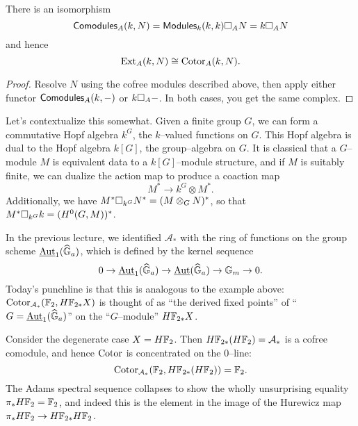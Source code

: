 \begin{corollary}
There is an isomorphism \[\mathsf{Comodules}_A(k, N) = \mathsf{Modules}_k(k, k) \square_A N = k \square_A N\] and hence \[\operatorname{Ext}_A(k, N) \cong \operatorname{Cotor}_A(k, N).\]
\end{corollary}
\begin{proof}
Resolve $N$ using the cofree modules described above, then apply either functor $\mathsf{Comodules}_A(k, -)$ or $k \square_A -$.  In both cases, you get the same complex.
\end{proof}

\begin{example}\label{HopfAlgebrasFromFiniteGroups}
Let's contextualize this somewhat.  Given a finite group $G$, we can form a commutative Hopf algebra $k^G$, the $k$--valued functions on $G$.  This Hopf algebra is dual to the Hopf algebra $k[G]$, the group--algebra on $G$.  It is classical that a $G$--module $M$ is equivalent data to a $k[G]$--module structure, and if $M$ is suitably finite, we can dualize the action map to produce a coaction map \[M^* \to k^G \otimes M^*.\]  Additionally, we have $M^* \square_{k^G} N^* = (M \otimes_G N)^*$, so that $M^* \square_{k^G} k = (H^0 (G,M))^*$.
\end{example}

\begin{example}\label{HF2HomologyIsValuedInAutGaEquivarModules}
In the previous lecture, we identified $\mathcal A_*$ with the ring of functions on the group scheme $\operatorname{\underline{\smash{\operatorname{Aut}}}}_1(\widehat{\mathbb G}_a)$, which is defined by the kernel sequence \[0 \to \operatorname{\underline{\smash{\operatorname{Aut}}}}_1(\widehat{\mathbb G}_a) \to \operatorname{\underline{\smash{\operatorname{Aut}}}}(\widehat{\mathbb G}_a) \to \mathbb G_m \to 0.\]    Today's punchline is that this is analogous to the example above: $\operatorname{Cotor}_{\mathcal A_*}(\mathbb F_2, H\mathbb F_{2*} X)$ is thought of as ``the derived fixed points'' of ``$G = \operatorname{\underline{\smash{\operatorname{Aut}}}}_1(\widehat{\mathbb G}_a)$'' on the ``$G$--module'' $H\mathbb F_{2*} X$.  
\end{example}

\begin{example}
Consider the degenerate case $X = H\mathbb F_2$.  Then $H\mathbb F_{2*}(H\mathbb F_2) = \mathcal A_*$ is a cofree comodule, and hence $\operatorname{Cotor}$ is concentrated on the $0$--line: \[\operatorname{Cotor}_{\mathcal A_*}(\mathbb F_2, H\mathbb F_{2*}(H\mathbb F_2)) = \mathbb F_2.\]  The Adams spectral sequence collapses to show the wholly unsurprising equality $\pi_* H\mathbb F_2 = \mathbb F_2$, and indeed this is the element in the image of the Hurewicz map $\pi_* H\mathbb F_2 \to H\mathbb F_{2*} H\mathbb F_2$.
\end{example}

